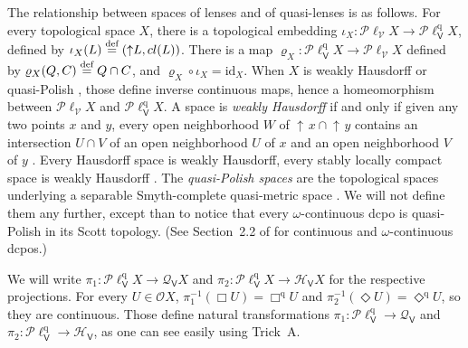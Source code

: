 \documentclass[preprint,12pt]{elsarticle}
\newcommand\eqdef{\mathrel{\buildrel \text{def}\over=}}
\DeclareMathOperator{\upc}{\uparrow\!}
\newcommand\identity[1]{\mathrm{id}_{#1}}
\newcommand\Smyth{{\mathcal Q}}
\newcommand\Hoare{{\mathcal H}}
\newcommand\Vt{\mathsf{V}}
\newcommand\HV{\Hoare_\Vt}
\newcommand\SV{\Smyth_{\Vt}}
\newcommand\quasi{\mathrm{q}} %
\newcommand\QL{\Plotkin^\quasi}
\newcommand\QLV{\QL_\Vt}
\newcommand\Plotkin{\mathcal P\ell} %
\newcommand\Plotkinn{\Plotkin_{\mathcal V}}
\newcommand\Open{{\mathcal O}}
\begin{document}
The relationship between spaces of lenses and of quasi-lenses is as
follows.  For every topological space $X$, there is a topological
embedding $\iota_X \colon \Plotkinn X \to \QLV X$, defined by
$\iota_X (L) \eqdef (\upc L, cl (L))$.  There is a map
$\varrho_X \colon \QLV X \to \Plotkinn X$ defined by
$\varrho_X (Q, C) \eqdef Q \cap C$, and
$\varrho_X \circ \iota_X = \identity X$.  When $X$ is weakly Hausdorff
\cite[Lemma~6.1, Proposition~6.2, Theorem~6.3]{JGL:wHaus} or
quasi-Polish \cite[Theorem 9.6]{JGL:projlim:prev}, those define
inverse continuous maps, hence a homeomorphism between $\Plotkinn X$
and $\QLV X$.  A space is \emph{weakly Hausdorff} if and only if given
any two points $x$ and $y$, every open neighborhood $W$ of
$\upc x \cap \upc y$ contains an intersection $U \cap V$ of an open
neighborhood $U$ of $x$ and an open neighborhood $V$ of $y$
\cite[Lemma~6.6]{KL:measureext}.  Every Hausdorff space is weakly
Hausdorff, every stably locally compact space is weakly Hausdorff
\cite[Lemma~8.1]{KL:measureext}.  The \emph{quasi-Polish spaces} are
the topological spaces underlying a separable Smyth-complete
quasi-metric space \cite{deBrecht:qPolish}.  We will not define them
any further, except than to notice that every $\omega$-continuous dcpo
is quasi-Polish in its Scott topology.  (See Section~2.2 of
\cite{AJ:domains} for continuous and $\omega$-continuous dcpos.)

We will write $\pi_1 \colon \QLV X \to \SV X$ and
$\pi_2 \colon \QLV X \to \HV X$ for the respective projections.  For
every $U \in \Open X$, $\pi_1^{-1} (\Box U) = \Box^\quasi U$ and
$\pi_2^{-1} (\Diamond U) = \Diamond^\quasi U$, so they are continuous.
Those define natural transformations $\pi_1 \colon \QLV \to \SV$ and
$\pi_2 \colon \QLV \to \HV$, as one can see easily using Trick~A.
\end{document}
